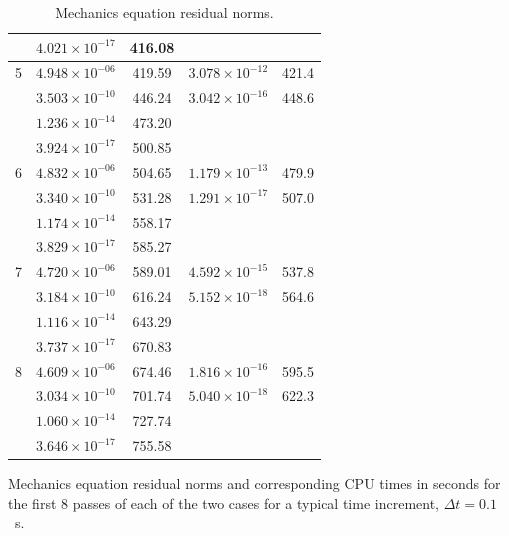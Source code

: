 \begin{table}
\begin{center}
\begin{tabular}{|r|c|c|c|c|}
      & $ 4.021\times 10^{-17}$ &  416.08   & $                    $   &  \\
\hline                                    
5     & $ 4.948\times 10^{-06}$ &  419.59   & $3.078 \times 10^{-12}$  &  421.4 \\
      & $ 3.503\times 10^{-10}$ &  446.24   & $3.042 \times 10^{-16}$  &  448.6 \\
      & $ 1.236\times 10^{-14}$ &  473.20   & $                    $   &  \\
      & $ 3.924\times 10^{-17}$ &  500.85   & $                    $   &  \\
\hline                                    
6     & $ 4.832\times 10^{-06}$ &  504.65   & $1.179 \times 10^{-13}$  &  479.9 \\
      & $ 3.340\times 10^{-10}$ &  531.28   & $1.291 \times 10^{-17}$  &  507.0 \\
      & $ 1.174\times 10^{-14}$ &  558.17   & $                    $   &  \\
      & $ 3.829\times 10^{-17}$ &  585.27   & $                    $   &  \\
\hline                                    
7     & $ 4.720\times 10^{-06}$ &  589.01   & $4.592 \times 10^{-15}$  &  537.8 \\
      & $ 3.184\times 10^{-10}$ &  616.24   & $5.152 \times 10^{-18}$  &  564.6 \\
      & $ 1.116\times 10^{-14}$ &  643.29   & $                    $   &  \\
      & $ 3.737\times 10^{-17}$ &  670.83   & $                    $   &  \\
\hline                                    
8     & $ 4.609\times 10^{-06}$ &  674.46   & $1.816 \times 10^{-16}$  &  595.5  \\
      & $ 3.034\times 10^{-10}$ &  701.74   & $5.040 \times 10^{-18}$  &  622.3  \\
      & $ 1.060\times 10^{-14}$ &  727.74   & $                    $   &  \\
      & $ 3.646\times 10^{-17}$ &  755.58   & $                    $   &  \\
\hline
\end{tabular}
\caption{Mechanics equation residual norms.}
\label{resnorms}
\end{center}
{Mechanics equation residual norms and corresponding CPU times in
  seconds for the first 8 passes of each of the two cases for a
  typical time increment, \mbox{$\Delta t=0.1$ s}.}
\end{table}

